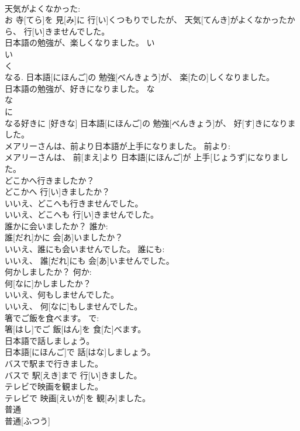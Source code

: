 \documentclass[8pt]{extreport}
\begin{document}
\begin{CJK}{UTF8}{min}
\\	天気がよくなかった: 
\\	お 寺[てら]を 見[み]に 行[い]くつもりでしたが、 天気[てんき]がよくなかったから、 行[い]きませんでした。	
\\	日本語の勉強が、楽しくなりました。	い 
\\	い 
\\	く
\\	なる.	日本語[にほんご]の 勉強[べんきょう]が、 楽[たの]しくなりました。	
\\	日本語の勉強が、好きになりました。	な 
\\	な 
\\	に 
\\	なる好きに [好きな]	日本語[にほんご]の 勉強[べんきょう]が、 好[す]きになりました。	
\\	メアリーさんは、前より日本語が上手になりました。	前より: 
\\	メアリーさんは、 前[まえ]より 日本語[にほんご]が 上手[じょうず]になりました。	
\\	どこかへ行きましたか？	
\\	どこかへ 行[い]きましたか？	
\\	いいえ、どこへも行きませんでした。	
\\	いいえ、どこへも 行[い]きませんでした。	
\\	誰かに会いましたか？	誰か: 
\\	誰[だれ]かに 会[あ]いましたか？	
\\	いいえ、誰にも会いませんでした。	誰にも: 
\\	いいえ、 誰[だれ]にも 会[あ]いませんでした。	
\\	何かしましたか？	何か: 
\\	何[なに]かしましたか？	
\\	いいえ、何もしませんでした。	
\\	いいえ、 何[なに]もしませんでした。	
\\	箸でご飯を食べます。	で: 
\\	箸[はし]でご 飯[はん]を 食[た]べます。	
\\	日本語で話しましょう。	
\\	日本語[にほんご]で 話[はな]しましょう。	
\\	バスで駅まで行きました。	
\\	バスで 駅[えき]まで 行[い]きました。	
\\	テレビで映画を観ました。	
\\	テレビで 映画[えいが]を 観[み]ました。	
\\	普通	
\\	普通[ふつう]		

\end{CJK}
\end{document}
